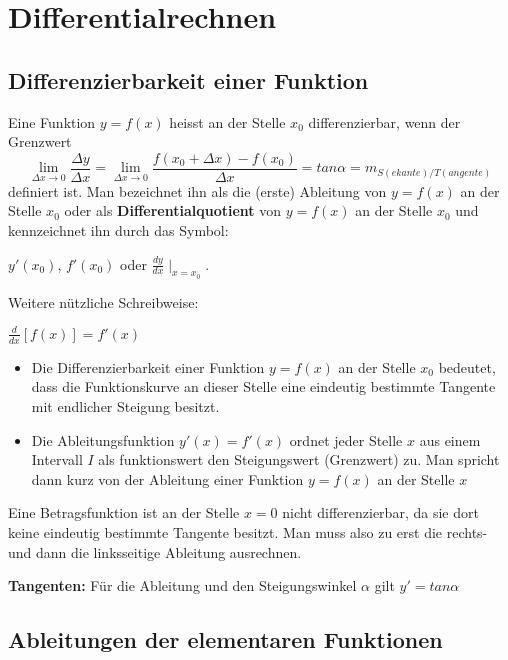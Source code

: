 \chapter{Differentialrechnen}
\section{Differenzierbarkeit einer Funktion}
Eine Funktion \(y=f(x)\) heisst an der Stelle \(x_0\) differenzierbar, wenn der Grenzwert
\[ \lim\limits_{\Delta x \rightarrow 0}{\frac{\Delta y}{\Delta x}} = \lim\limits_{\Delta x \rightarrow 0}{\frac{f(x_0 + \Delta x)-f(x_0)}{\Delta x}} = tan \alpha = m_{S(ekante)/T(angente)} \]
definiert ist. Man bezeichnet ihn als die (erste) Ableitung von \(y=f(x)\) an der Stelle \(x_0\) oder als \textbf{Differentialquotient} von \(y=f(x)\) an der Stelle \(x_0\) und kennzeichnet ihn durch das Symbol:

 \hspace*{10mm}\(y'(x_0)\), \(f'(x_0)\) oder \(\frac{dy}{dx} \mid_{x=x_0}\).

Weitere nützliche Schreibweise:

\hspace*{10mm}\(\frac{d}{dx}[f(x)] = f'(x)\)

\begin{itemize}
	\item Die Differenzierbarkeit einer Funktion \(y=f(x)\) an der Stelle \(x_0\) bedeutet, dass die Funktionskurve an dieser Stelle eine eindeutig bestimmte Tangente mit endlicher Steigung besitzt.
	\item Die Ableitungsfunktion \(y'(x)=f'(x)\) ordnet jeder Stelle \(x\) aus einem Intervall \(I\) als funktionswert den Steigungswert (Grenzwert) zu. Man spricht dann kurz von der Ableitung einer Funktion \(y=f(x)\) an der Stelle \(x\)
\end{itemize}
Eine Betragsfunktion ist an der Stelle \(x=0\) nicht differenzierbar, da sie dort keine eindeutig bestimmte Tangente besitzt. Man muss also zu erst die rechts- und dann die linksseitige Ableitung ausrechnen.
\par \textbf{Tangenten:} Für die Ableitung und den Steigungswinkel \(\alpha\) gilt \(y'=tan \alpha\)

\section{Ableitungen der elementaren Funktionen}

